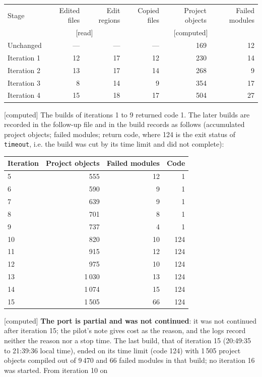 \documentclass[11pt,a4paper]{article}
\theoremstyle{plain}
\theoremstyle{definition}
\theoremstyle{remark}
\numberwithin{equation}{section}
\newcommand{\st}[1]{\textsf{[#1]}}
\begin{document}
\begin{center}\small
\begin{tabular}{@{}lrrrrr@{}}
\toprule Stage & Edited files & Edit regions & Copied files & Project objects & Failed modules\\
 & \multicolumn{2}{c}{\st{read}} & \multicolumn{3}{c}{\st{computed}}\\\midrule
Unchanged & --- & --- & --- & 169 & 12\\
Iteration 1 & 12 & 17 & 12 & 230 & 14\\
Iteration 2 & 13 & 17 & 14 & 268 & 9\\
Iteration 3 & 8 & 14 & 9 & 354 & 17\\
Iteration 4 & 15 & 18 & 17 & 504 & 27\\
\bottomrule
\end{tabular}\end{center}
\st{computed} The builds of iterations 1 to 9 returned code 1. The later builds are recorded in the follow-up file and in the build records as follows
(accumulated project objects; failed modules; return code, where 124 is the exit status of \texttt{timeout}, i.e. the build was cut by its time limit and
did not complete):
\begin{center}\small
\begin{tabular}{@{}lrrr@{}}
\toprule Iteration & Project objects & Failed modules & Code\\\midrule
5 & 555 & 12 & 1\\ 6 & 590 & 9 & 1\\ 7 & 639 & 9 & 1\\ 8 & 701 & 8 & 1\\ 9 & 737 & 4 & 1\\
10 & 820 & 10 & 124\\ 11 & 915 & 12 & 124\\ 12 & 975 & 10 & 124\\ 13 & 1\,030 & 13 & 124\\ 14 & 1\,074 & 15 & 124\\
15 & 1\,505 & 66 & 124\\
\bottomrule
\end{tabular}\end{center}
\st{computed} \textbf{The port is partial and was not continued}: it was not continued after iteration 15; the pilot's note gives cost as the reason, and the logs record neither the reason nor a stop time. The last build, that of iteration 15 (20:49:35 to 21:39:36 local time), ended on its time limit (code 124) with 1\,505 project objects compiled out of 9\,470 and 66 failed modules in that build; no iteration 16 was started. From iteration 10 on
\end{document}
